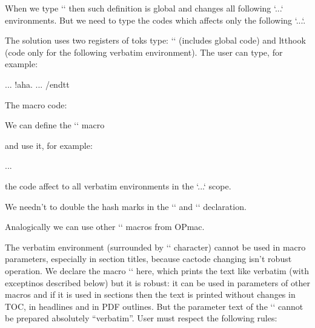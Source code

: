  


When we type `\def\tthook{code}` then such definition is global and changes all following `\begtt...\endtt` environments. But we need to type the codes which affects only the following `\begtt...\endtt`. 



The solution uses two registers of toks type: `\gtthook` (includes global code) and {\tt{}}ltthook (code only for the following verbatim environment). The user can type, for example: 

\begtt
\gtthook {\typosize[9/11]}    %
\begtt 
... !aha. ... 
/endtt 
\endtt


The macro code: 

\begtt
\newtoks\gtthook  \newtoks\ltthook 
\def\tthook{\the\gtthook \the\ltthook \global\ltthook{}} 
\endtt


We can define the `\addtoks` macro 

\begtt
\def\addtoks#1#2{#1\expandafter{\the#1#2}} 
\endtt


and use it, for example: 

\begtt
\bgroup \addtoks\gtthook{code} ... \egroup 
\endtt


the code affect to all verbatim environments in the `\bgroup...\egroup` scope. 



We needn't to double the hash marks in the `\gtthook` and `\ltthook` declaration. 



Analogically we can use other `\foohook` macros from OPmac. 


 


The verbatim environment (surrounded by `\activettchar` character) cannot be used in macro parameters, especially in section titles, because cactode changing isn't robust operation. We declare the macro `` here, which prints the text like verbatim (with exceptinos described below) but it is robust: it can be used in parameters of other macros and if it is used in sections then the text is printed without changes in TOC, in headlines and in PDF outlines. But the parameter text of the `\code` cannot be prepared absolutely “verbatim”. User must respect the following rules: 



